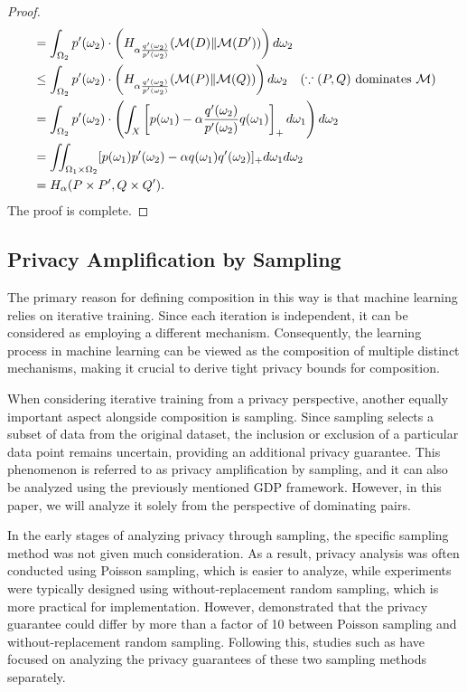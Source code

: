 \documentclass{article}
\begin{document}
\begin{theorem}
\begin{proof}
\begin{align*}
      &= \int_{\Omega_2}p'(\omega_2)\cdot \left(H_{\alpha\frac{q'(\omega_2)}{p'(\omega_2)} }({\mathcal{M}}(D)\Vert{\mathcal{M}}(D')) \right) d\omega_2\\
      &\le \int_{\Omega_2} p'(\omega_2) \cdot \left(H_{\alpha\frac{q'(\omega_2)}{p'(\omega_2)} }({\mathcal{M}}(P)\Vert{\mathcal{M}}(Q)) \right) d\omega_2 \quad (\because (P,Q) \text{ dominates } {\mathcal{M}})\\
      & = \int_{\Omega_2} p'(\omega_2) \cdot \left( \int_X \left[p(\omega_1) - \alpha \frac{q'(\omega_2)}{p'(\omega_2)}q(\omega_1) \right]_+ d\omega_1 \right)d\omega_2\\
      & = \iint_{\Omega_1 \times \Omega_2} [p(\omega_1)p'(\omega_2) - \alpha q(\omega_1)q'(\omega_2)]_+ d\omega_1 d\omega_2\\
      &= H_\alpha(P\times P', Q \times Q').
    \end{align*}
    The proof is complete.
    \end{proof}
\end{theorem}
\subsection{Privacy Amplification by Sampling}
The primary reason for defining composition in this way is that machine learning relies on iterative training. Since each iteration is independent, it can be considered as employing a different mechanism. Consequently, the learning process in machine learning can be viewed as the composition of multiple distinct mechanisms, making it crucial to derive tight privacy bounds for composition.  

When considering iterative training from a privacy perspective, another equally important aspect alongside composition is sampling. Since sampling selects a subset of data from the original dataset, the inclusion or exclusion of a particular data point remains uncertain, providing an additional privacy guarantee. This phenomenon is referred to as privacy amplification by sampling, and it can also be analyzed using the previously mentioned GDP framework. However, in this paper, we will analyze it solely from the perspective of dominating pairs.

In the early stages of analyzing privacy through sampling, the specific sampling method was not given much consideration. As a result, privacy analysis was often conducted using Poisson sampling, which is easier to analyze, while experiments were typically designed using without-replacement random sampling, which is more practical for implementation. However, \cite{chua2024private} demonstrated that the privacy guarantee could differ by more than a factor of 10 between Poisson sampling and without-replacement random sampling. Following this, studies such as \cite{lebeda2024avoiding} have focused on analyzing the privacy guarantees of these two sampling methods separately.  
\end{document}
